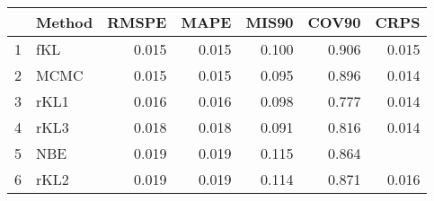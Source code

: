 \documentclass[12pt]{article}
\begin{document}
\thispagestyle{empty}
\begin{table}[ht]
\centering
\begin{tabular}{rlrrrrr}
  \hline
 & Method & RMSPE & MAPE & MIS90 & COV90 & CRPS \\ 
  \hline
1 & fKL & 0.015 & 0.015 & 0.100 & 0.906 & 0.015 \\ 
  2 & MCMC & 0.015 & 0.015 & 0.095 & 0.896 & 0.014 \\ 
  3 & rKL1 & 0.016 & 0.016 & 0.098 & 0.777 & 0.014 \\ 
  4 & rKL3 & 0.018 & 0.018 & 0.091 & 0.816 & 0.014 \\ 
  5 & NBE & 0.019 & 0.019 & 0.115 & 0.864 &  \\ 
  6 & rKL2 & 0.019 & 0.019 & 0.114 & 0.871 & 0.016 \\ 
   \hline
\end{tabular}
\end{table}
\end{document}

